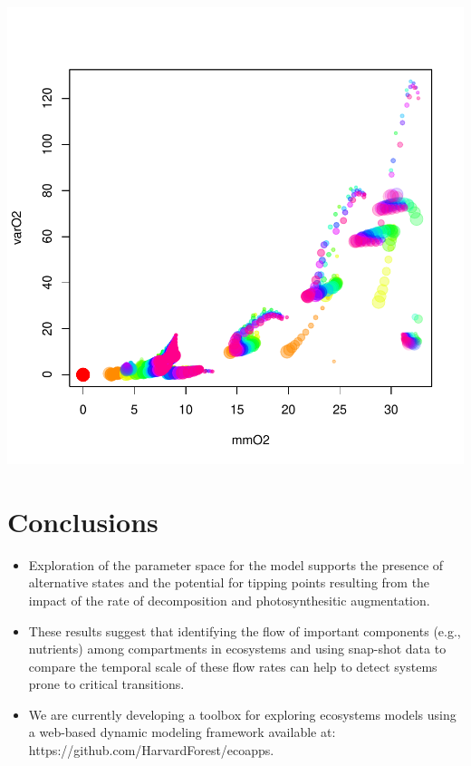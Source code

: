 \documentclass[a0,landscape]{a0poster}
\begin{document}
\begin{multicols}{4}
\begin{block}{}
\end{block}

\begin{block}
\includegraphics{conference_poster_5-sens}

\end{block}


\color{SaddleBrown} %

\section*{Conclusions}

\begin{itemize}
\item Exploration of the parameter space for the model supports the
  presence of alternative states and the potential for tipping points
  resulting from the impact of the rate of decomposition and
  photosynthesitic augmentation.
\item These results suggest that identifying the flow of important
  components (e.g., nutrients) among compartments in ecosystems and
  using snap-shot data to compare the temporal scale of these flow
  rates can help to detect systems prone to critical transitions.
\item We are currently developing a toolbox for exploring ecosystems
  models using a web-based dynamic modeling framework available at:
  https://github.com/HarvardForest/ecoapps.
\end{itemize}


\end{multicols}
\end{document}
